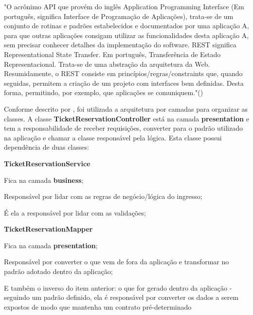 "O acrônimo API que provém do inglês Application Programming Interface (Em português, significa 
Interface de Programação de Aplicações), trata-se de um conjunto de rotinas e padrões estabelecidos
e documentados por uma aplicação A, para que outras aplicações consigam utilizar as funcionalidades 
desta aplicação A, sem precisar conhecer detalhes da implementação do software.
REST significa Representational State Transfer. Em português, Transferência de Estado Representacional. Trata-se de uma
abstração da arquitetura da Web. Resumidamente, o REST consiste em princípios/regras/constraints que, quando seguidas,
permitem a criação de um projeto com interfaces bem definidas. Desta forma, permitindo, por exemplo, que aplicações se
comuniquem."(\cite{o-que-e-api-rest-e-restful})

Conforme descrito por \cite{mark-richards-software-architecture-patterns},
foi utilizada a arquitetura por camadas para organizar as classes.
A classe \textbf{TicketReservationController} está na camada \textbf{presentation} e tem a
responsabilidade de receber requisições, converter para o padrão utilizado na
aplicação e chamar a classe responsável pela lógica.
Esta classe possui dependência de duas classes:

\begin{alineas}

  \item \textbf{TicketReservationService}

  \begin{alineas}
     \item Fica na camada \textbf{business};
     \item Responsável por lidar com as regras de negócio/lógica do ingresso;
     \item É ela a responsável por lidar com as validações;
  \end{alineas}

  \item \textbf{TicketReservationMapper}

  \begin{alineas}
     \item Fica na camada \textbf{presentation};
     \item Responsável por converter o que vem de fora da aplicação e transformar
           no padrão adotado dentro da aplicação;
     \item E também o inverso do item anterior: o que for gerado dentro da aplicação -
           seguindo um padrão definido, ela é responsável por converter
           os dados a serem expostos de modo que mantenha um contrato pré-determinado
  \end{alineas}

\end{alineas}

